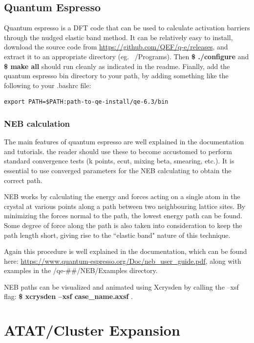 \documentclass[12pt]{article}
\begin{document}
\subsection{Quantum Espresso}
Quantum espresso is a DFT code that can be used to calculate activation barriers through the  nudged elastic band method. It can be relatively easy to install,  download the source code from \url{https://github.com/QEF/q-e/releases}, and extract it to an appropriate directory (eg. ~/Programs).  Then \textbf{\$ ./configure} and \textbf{\$ make all} should run cleanly as indicated in the readme.  Fianlly, add the quantum espresso bin directory to your path, by adding something like the following to your .bashrc file:

\begin{lstlisting}
export PATH=$PATH:path-to-qe-install/qe-6.3/bin
\end{lstlisting}

\subsubsection{NEB calculation}
The main features of quantum espresso are well explained in the documentation and tutorials.  the reader should use these to become accustomed to perform standard convergence tests (k points, ecut, mixing beta, smearing, etc.). It is essential to use converged parameters for the NEB calculating to obtain the correct path.  

NEB works by calculating the energy and forces acting on a single atom in the crystal at various points along a path between two neighbouring lattice sites. By minimizing the forces normal to the path, the lowest energy path can be found.  Some degree of force along the path is also taken into consideration to keep the path length short, giving rise to the ``elastic band" nature of this technique.   

Again this procedure is well explained in the documentation, which can be found here: \url{https://www.quantum-espresso.org/Doc/neb_user_guide.pdf}, along with examples in the /qe-\#\#/NEB/Examples directory.  

NEB paths can be visualized and animated using Xcrysden by calling the --xsf flag:  \textbf{\$ xcrysden --xsf case\_name.axsf }.  

\section{ATAT/Cluster Expansion}
\end{document}
